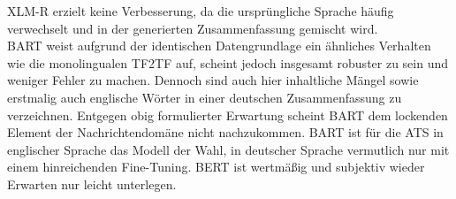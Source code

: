 \noindent
\ac{XLM-R} erzielt keine Verbesserung, da die ursprüngliche Sprache häufig verwechselt und in der generierten Zusammenfassung gemischt wird.\\

\noindent
\ac{BART} weist aufgrund der identischen Datengrundlage ein ähnliches Verhalten wie die monolingualen \ac{TF2TF} auf, scheint jedoch insgesamt robuster zu sein und weniger Fehler zu machen. Dennoch sind auch hier inhaltliche Mängel sowie erstmalig auch englische Wörter in einer deutschen Zusammenfassung zu verzeichnen. Entgegen obig formulierter Erwartung scheint \ac{BART} dem lockenden Element der Nachrichtendomäne nicht nachzukommen. \ac{BART} ist für die \ac{ATS} in englischer Sprache das Modell der Wahl, in deutscher Sprache vermutlich nur mit einem hinreichenden Fine-Tuning. \ac{BERT} ist wertmäßig und subjektiv wieder Erwarten nur leicht unterlegen.


